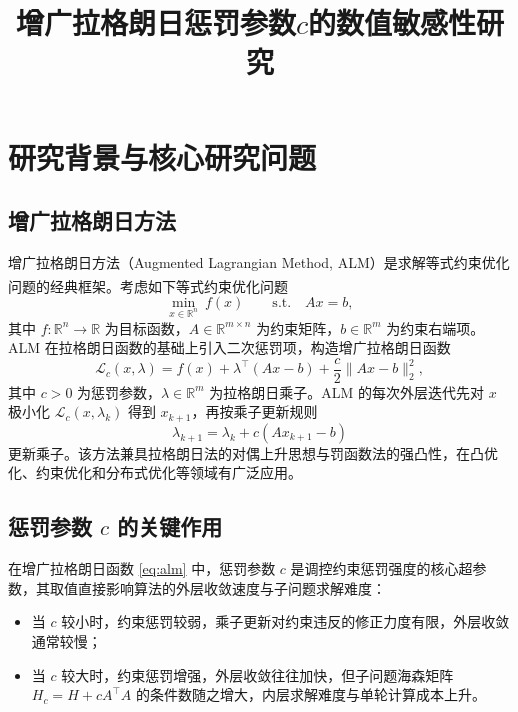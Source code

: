 \documentclass[UTF8]{ctexart}
\title{增广拉格朗日惩罚参数$c$的数值敏感性研究}
\author{}
\date{}
\numberwithin{figure}{section}
\newcommand{\scite}[1]{\textsuperscript{\cite{#1}}}
\theoremstyle{definition}
\theoremstyle{examplestyle}
\theoremstyle{remark}
\begin{document}
\maketitle

\section{研究背景与核心研究问题}
\label{sec:intro}

\subsection{增广拉格朗日方法}
\label{sec:alm-background}

增广拉格朗日方法（Augmented Lagrangian Method, ALM）是求解等式约束优化问题的经典框架\scite{bertsekas1982}。考虑如下等式约束优化问题
\begin{equation}
\label{eq:constrained}
\min_{x\in\mathbb{R}^n}\ f(x) \qquad \text{s.t.} \quad Ax=b,
\end{equation}
其中 $f:\mathbb{R}^n\to\mathbb{R}$ 为目标函数，$A\in\mathbb{R}^{m\times n}$ 为约束矩阵，$b\in\mathbb{R}^m$ 为约束右端项。ALM 在拉格朗日函数的基础上引入二次惩罚项，构造增广拉格朗日函数
\begin{equation}
\label{eq:alm}
\mathcal{L}_c(x,\lambda)=f(x)+\lambda^\top(Ax-b)+\frac{c}{2}\|Ax-b\|_2^2,
\end{equation}
其中 $c>0$ 为惩罚参数，$\lambda\in\mathbb{R}^m$ 为拉格朗日乘子。ALM 的每次外层迭代先对 $x$ 极小化 $\mathcal{L}_c(x,\lambda_k)$ 得到 $x_{k+1}$，再按乘子更新规则
\begin{equation}
\label{eq:multiplier-update}
\lambda_{k+1}=\lambda_k+c(Ax_{k+1}-b)
\end{equation}
更新乘子。该方法兼具拉格朗日法的对偶上升思想与罚函数法的强凸性，在凸优化、约束优化和分布式优化等领域有广泛应用。

\subsection{惩罚参数 $c$ 的关键作用}
\label{sec:c-role}

在增广拉格朗日函数 \eqref{eq:alm} 中，惩罚参数 $c$ 是调控约束惩罚强度的核心超参数，其取值直接影响算法的外层收敛速度与子问题求解难度：

\begin{itemize}
\item 当 $c$ 较小时，约束惩罚较弱，乘子更新对约束违反的修正力度有限，外层收敛通常较慢；
\item 当 $c$ 较大时，约束惩罚增强，外层收敛往往加快，但子问题海森矩阵 $H_c=H+cA^\top A$ 的条件数随之增大，内层求解难度与单轮计算成本上升。
\end{itemize}
\end{document}
